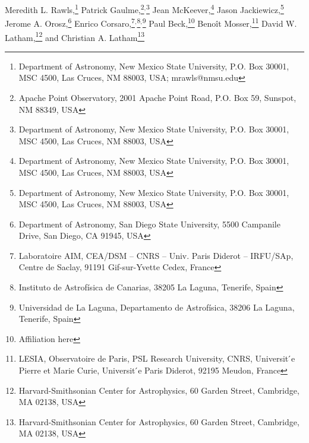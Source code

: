 Meredith L. Rawls,\footnote{Department of Astronomy, New Mexico State University, P.O. Box 30001, MSC 4500, Las Cruces, NM 88003, USA; mrawls@nmsu.edu}
\setcounter{footnote}{1}
Patrick Gaulme,\footnote{Apache Point Observatory, 2001 Apache Point Road, P.O. Box 59, Sunspot, NM 88349, USA}\setcounter{footnote}{0}$^{,}$\footnote{Department of Astronomy, New Mexico State University, P.O. Box 30001, MSC 4500, Las Cruces, NM 88003, USA}
\setcounter{footnote}{0}
Jean McKeever,\footnote{Department of Astronomy, New Mexico State University, P.O. Box 30001, MSC 4500, Las Cruces, NM 88003, USA}
\setcounter{footnote}{0}
Jason Jackiewicz,\footnote{Department of Astronomy, New Mexico State University, P.O. Box 30001, MSC 4500, Las Cruces, NM 88003, USA}
\setcounter{footnote}{2}
Jerome A. Orosz,\footnote{Department of Astronomy, San Diego State University, 5500 Campanile Drive, San Diego, CA 91945, USA}
Enrico Corsaro,\footnote{Laboratoire AIM, CEA/DSM – CNRS – Univ. Paris Diderot – IRFU/SAp, Centre de Saclay, 91191 Gif-sur-Yvette Cedex, France}$^{,}$\footnote{Instituto de Astrofísica de Canarias, 38205 La Laguna, Tenerife, Spain}$^{,}$\footnote{Universidad de La Laguna, Departamento de Astrofísica, 38206 La Laguna, Tenerife, Spain}
Paul Beck,\footnote{Affiliation here}
Beno\^it Mosser,\footnote{LESIA, Observatoire de Paris, PSL Research University, CNRS, Universit ́e Pierre et Marie Curie, Universit ́e Paris Diderot, 92195 Meudon, France}
David W. Latham,\footnote{Harvard-Smithsonian Center for Astrophysics, 60 Garden Street, Cambridge, MA 02138, USA}
and
\setcounter{footnote}{8}
Christian A. Latham\footnote{Harvard-Smithsonian Center for Astrophysics, 60 Garden Street, Cambridge, MA 02138, USA}